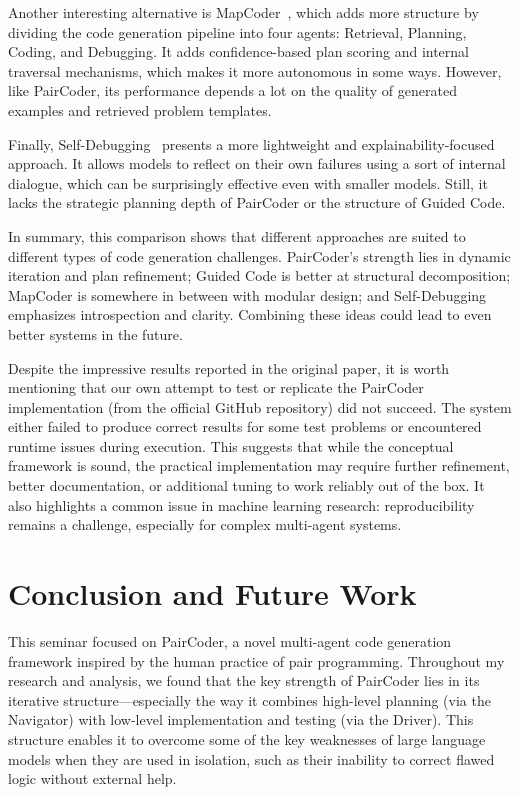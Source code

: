 \documentclass[11pt,a4paper]{article}
\begin{document}
Another interesting alternative is MapCoder~\cite{islam2024mapcodermultiagentcodegeneration}, which adds more structure by dividing the code generation pipeline into four agents: Retrieval, Planning, Coding, and Debugging. It adds confidence-based plan scoring and internal traversal mechanisms, which makes it more autonomous in some ways. However, like PairCoder, its performance depends a lot on the quality of generated examples and retrieved problem templates.

Finally, Self-Debugging~\cite{chen2024selfdebugging} presents a more lightweight and explainability-focused approach. It allows models to reflect on their own failures using a sort of internal dialogue, which can be surprisingly effective even with smaller models. Still, it lacks the strategic planning depth of PairCoder or the structure of Guided Code.

In summary, this comparison shows that different approaches are suited to different types of code generation challenges. PairCoder’s strength lies in dynamic iteration and plan refinement; Guided Code is better at structural decomposition; MapCoder is somewhere in between with modular design; and Self-Debugging emphasizes introspection and clarity. Combining these ideas could lead to even better systems in the future.

Despite the impressive results reported in the original paper, it is worth mentioning that our own attempt to test or replicate the PairCoder implementation (from the official GitHub repository) did not succeed. The system either failed to produce correct results for some test problems or encountered runtime issues during execution. This suggests that while the conceptual framework is sound, the practical implementation may require further refinement, better documentation, or additional tuning to work reliably out of the box. It also highlights a common issue in machine learning research: reproducibility remains a challenge, especially for complex multi-agent systems.


\section{Conclusion and Future Work}

This seminar focused on PairCoder, a novel multi-agent code generation framework inspired by the human practice of pair programming. Throughout my research and analysis, we found that the key strength of PairCoder lies in its iterative structure—especially the way it combines high-level planning (via the Navigator) with low-level implementation and testing (via the Driver). This structure enables it to overcome some of the key weaknesses of large language models when they are used in isolation, such as their inability to correct flawed logic without external help.
\end{document}
